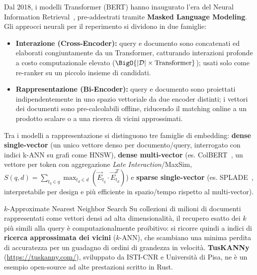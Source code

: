 Dal 2018, i modelli Transformer (BERT) hanno inaugurato l'era del Neural Information Retrieval~\cite{khattab2020,formal2021}, pre-addestrati tramite \textbf{Masked Language Modeling}. Gli approcci neurali per il reperimento si dividono in due famiglie:
\begin{itemize}
    \item \textbf{Interazione (Cross-Encoder):} query e documento sono concatenati ed elaborati congiuntamente da un Transformer, catturando interazioni profonde a costo computazionale elevato ($\BigO{|\mathcal{D}| \times \text{Transformer}}$); usati solo come re-ranker su un piccolo insieme di candidati.
    \item \textbf{Rappresentazione (Bi-Encoder):} query e documento sono proiettati indipendentemente in uno spazio vettoriale da due encoder distinti; i vettori dei documenti sono pre-calcolabili offline, riducendo il matching online a un prodotto scalare o a una ricerca di vicini approssimati.
\end{itemize}

Tra i modelli a rappresentazione si distinguono tre famiglie di embedding: \textbf{dense single-vector} (un unico vettore denso per documento/query, interrogato con indici k-ANN su grafi come HNSW), \textbf{dense multi-vector} (es. ColBERT~\cite{khattab2020}, un vettore per token con aggregazione \textit{Late Interaction}/MaxSim, $S(q,d) = \sum_{t_q \in q} \max_{t_d \in d} (\vec{E}_{t_q} \cdot \vec{E}_{t_d}^T)$) e \textbf{sparse single-vector} (es. SPLADE~\cite{formal2021}, interpretabile per design e pi\`u efficiente in spazio/tempo rispetto al multi-vector).

\begin{noteblock}{$k$-Approximate Nearest Neighbor Search}
Su collezioni di milioni di documenti rappresentati come vettori densi ad alta dimensionalit\`a, il recupero esatto dei $k$ pi\`u simili alla query \`e computazionalmente proibitivo: si ricorre quindi a indici di \textbf{ricerca approssimata dei vicini} ($k$-ANN), che scambiano una minima perdita di accuratezza per un guadagno di ordini di grandezza in velocit\`a. \textbf{TusKANNy} (\url{https://tuskanny.com/}), sviluppato da ISTI-CNR e Universit\`a di Pisa, ne \`e un esempio open-source ad alte prestazioni scritto in Rust.
\end{noteblock}
